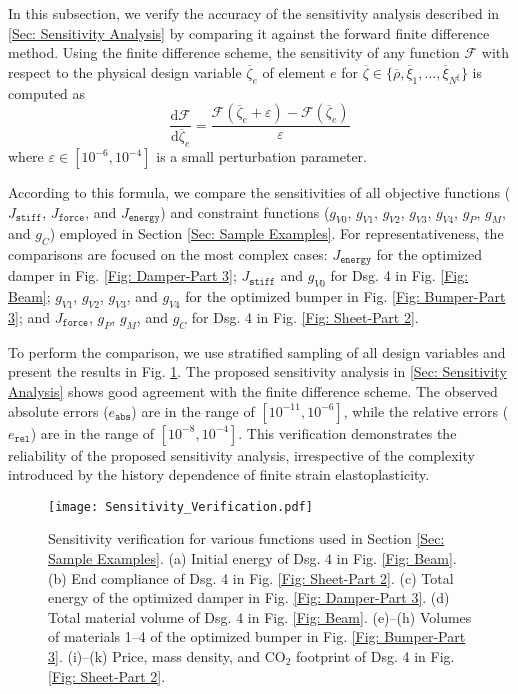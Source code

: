 \documentclass[preprint,11pt]{elsarticle}
\theoremstyle{definition}
\begin{document}
In this subsection, we verify the accuracy of the sensitivity analysis described in \ref{Sec: Sensitivity Analysis} by comparing it against the forward finite difference method. Using the finite difference scheme, the sensitivity of any function $\mathcal{F}$ with respect to the physical design variable $\overline{\zeta}_e$ of element $e$ for $\overline{\zeta} \in \{ \overline{\rho}, \overline{\xi}_1, \ldots, \overline{\xi}_{N^\xi} \}$ is computed as
\begin{equation*}
    \dfrac{\text{d} \mathcal{F}}{\text{d} \overline{\zeta}_e} = \dfrac{\mathcal{F}(\overline{\zeta}_e + \varepsilon) - \mathcal{F}(\overline{\zeta}_e)}{\varepsilon}
\end{equation*}
where $\varepsilon \in [10^{-6}, 10^{-4}]$ is a small perturbation parameter.

According to this formula, we compare the sensitivities of all objective functions ($J_\texttt{stiff}$, $J_\texttt{force}$, and $J_\texttt{energy}$) and constraint functions ($g_{V0}$, $g_{V1}$, $g_{V2}$, $g_{V3}$, $g_{V4}$, $g_P$, $g_M$, and $g_C$) employed in Section \ref{Sec: Sample Examples}. For representativeness, the comparisons are focused on the most complex cases: $J_\texttt{energy}$ for the optimized damper in Fig. \ref{Fig: Damper-Part 3}; $J_\texttt{stiff}$ and $g_{V0}$ for Dsg. 4 in Fig. \ref{Fig: Beam}; $g_{V1}$, $g_{V2}$, $g_{V3}$, and $g_{V4}$ for the optimized bumper in Fig. \ref{Fig: Bumper-Part 3}; and $J_\texttt{force}$, $g_P$, $g_M$, and $g_C$ for Dsg. 4 in Fig. \ref{Fig: Sheet-Part 2}.

To perform the comparison, we use stratified sampling of all design variables and present the results in Fig. \ref{Fig: Sensitivity Verification}. The proposed sensitivity analysis in \ref{Sec: Sensitivity Analysis} shows good agreement with the finite difference scheme. The observed absolute errors ($e_\texttt{abs}$) are in the range of $[10^{-11}, 10^{-6}]$, while the relative errors ($e_\texttt{rel}$) are in the range of $[10^{-8}, 10^{-4}]$. This verification demonstrates the reliability of the proposed sensitivity analysis, irrespective of the complexity introduced by the history dependence of finite strain elastoplasticity.

\begin{figure}[!htbp]
    \centering
    \texttt{[image: Sensitivity\_Verification.pdf]}
    \caption{Sensitivity verification for various functions used in Section \ref{Sec: Sample Examples}. (a) Initial energy of Dsg. 4 in Fig. \ref{Fig: Beam}. (b) End compliance of Dsg. 4 in Fig. \ref{Fig: Sheet-Part 2}. (c) Total energy of the optimized damper in Fig. \ref{Fig: Damper-Part 3}. (d) Total material volume of Dsg. 4 in Fig. \ref{Fig: Beam}. (e)--(h) Volumes of materials 1--4 of the optimized bumper in Fig. \ref{Fig: Bumper-Part 3}. (i)--(k) Price, mass density, and CO$_2$ footprint of Dsg. 4 in Fig. \ref{Fig: Sheet-Part 2}.}
    \label{Fig: Sensitivity Verification}
\end{figure}
\end{document}
